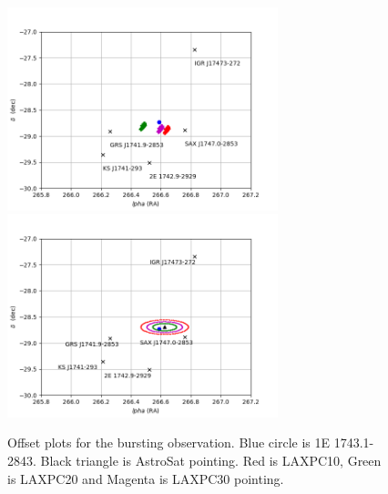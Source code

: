 \documentclass[11pt,a4paper,eulermath,pdfspacing]{article} %
\begin{document}
\begin{enumerate}
\begin{figure}[!b]
	\centering
	\includegraphics[width=0.7\textwidth]{./1st_try.png}
	\includegraphics[width=0.7\textwidth]{./2nd_try.png}
	\caption{Offset plots for the bursting observation. Blue circle is 1E
	1743.1-2843. Black triangle is AstroSat pointing. Red is LAXPC10, Green is
	LAXPC20 and Magenta is LAXPC30 pointing.}
	\label{fig:fixvar}
\end{figure}




\end{enumerate}
\end{document}
